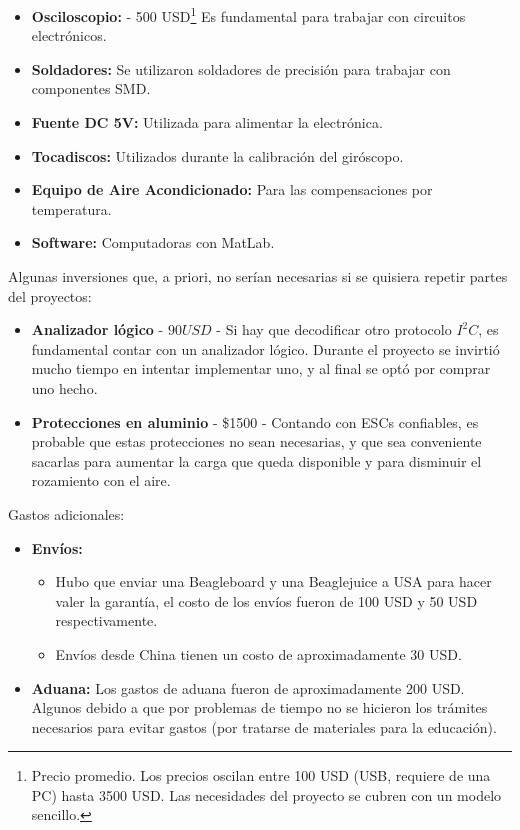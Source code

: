 \documentclass[main]{subfiles}
\begin{document}
\begin{itemize}
\item \textbf{Osciloscopio:} - 500 USD\footnote{Precio promedio. Los precios oscilan entre 100 USD (USB, requiere de una PC) hasta 3500 USD. Las necesidades del proyecto se cubren con un modelo sencillo.} Es fundamental para trabajar con circuitos electrónicos.
\item \textbf{Soldadores:} Se utilizaron soldadores de precisión para trabajar con componentes SMD.
\item \textbf{Fuente DC 5V:} Utilizada para alimentar la electrónica.
\item \textbf{Tocadiscos:} Utilizados durante la calibración del giróscopo.
\item \textbf{Equipo de Aire Acondicionado:} Para las compensaciones por temperatura.
\item \textbf{Software:} Computadoras con MatLab.
\end{itemize}

Algunas inversiones que, a priori, no serían necesarias si se quisiera repetir partes del proyectos:

\begin{itemize}
\item \textbf{Analizador lógico} - $90 USD$ - Si hay que decodificar otro protocolo $I^2C$, es fundamental contar con un analizador lógico. Durante el proyecto se invirtió mucho tiempo en intentar implementar uno, y al final se optó por comprar uno hecho.
\item \textbf{Protecciones en aluminio} - \$1500 - Contando con ESCs confiables, es probable que estas protecciones no sean necesarias, y que sea conveniente sacarlas para aumentar la carga que queda disponible y para disminuir el rozamiento con el aire.
\end{itemize}

Gastos adicionales:

\begin{itemize}
\item \textbf{Envíos:}
  \begin{itemize}
  \item Hubo que enviar una Beagleboard y una Beaglejuice a USA para hacer valer la garantía, el costo de los envíos fueron de 100 USD y 50 USD respectivamente.
  \item Envíos desde China tienen un costo de aproximadamente 30 USD.
  \end{itemize}
\item \textbf{Aduana:} Los gastos de aduana fueron de aproximadamente 200 USD. Algunos debido a que por problemas de tiempo no se hicieron los trámites necesarios para evitar gastos (por tratarse de materiales para la educación).
\end{itemize}
\end{document}
